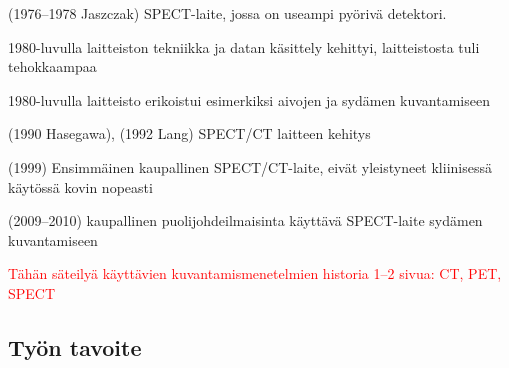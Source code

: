 (1976--1978 Jaszczak) SPECT-laite, jossa on useampi pyörivä detektori.\cite{jaszczak_early_2006, hutton_origins_2014}

1980-luvulla laitteiston tekniikka ja datan käsittely kehittyi, laitteistosta tuli tehokkaampaa\cite{jaszczak_early_2006}

1980-luvulla laitteisto erikoistui esimerkiksi aivojen ja sydämen kuvantamiseen\cite{hutton_origins_2014}

(1990 Hasegawa), (1992 Lang) SPECT/CT laitteen kehitys\cite{hutton_origins_2014}

(1999) Ensimmäinen kaupallinen SPECT/CT-laite, eivät yleistyneet kliinisessä käytössä kovin nopeasti\cite{hutton_origins_2014}

(2009--2010) kaupallinen puolijohdeilmaisinta käyttävä SPECT-laite sydämen kuvantamiseen\cite{hutton_origins_2014}
 
\textcolor{red}{Tähän säteilyä käyttävien kuvantamismenetelmien historia 1--2 sivua: CT, PET, SPECT}
\subsection{Työn tavoite}